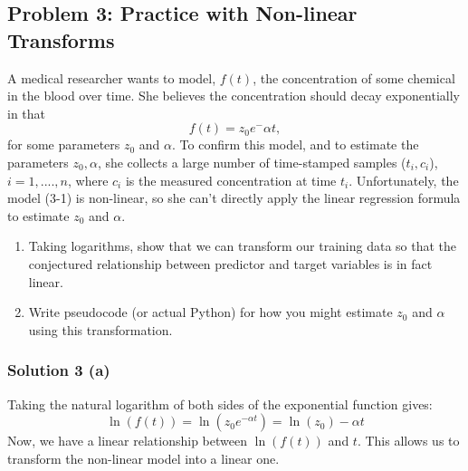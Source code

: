 \documentclass{assignment}
\begin{document}
\begin{problem}
\section{Problem 3: Practice with Non-linear Transforms}   

\noindent A medical researcher wants to model, $f(t)$, the concentration of some chemical in the blood over time. She believes the concentration should decay exponentially in that
\begin{equation}
    f(t) = z_0e^-{\alpha t},
\end{equation}
for some parameters $z_0$ and $\alpha$. To confirm this model, and to estimate the parameters $z_0, \alpha$, she collects a large number of time-stamped samples ($t_i,c_i$), $i = 1,....,n$, where $c_i$ is the measured concentration at time $t_i$. Unfortunately, the model (3-1) is non-linear, so she can't directly apply the linear regression formula to estimate $z_0$ and $\alpha$.
\begin{enumerate}[label=(\alph*)]
    \item Taking logarithms, show that we can transform our training data so that the conjectured relationship between predictor and target variables is in fact linear.
    \item Write pseudocode (or actual Python) for how you might estimate $z_0$ and $\alpha$ using this transformation. 
\end{enumerate}

\subsubsection*{Solution 3 (a)}
\noindent Taking the natural logarithm of both sides of the exponential function gives:
\begin{equation}
    \ln(f(t)) = \ln(z_0e^{-\alpha t}) = \ln(z_0) - \alpha t
\end{equation}
Now, we have a linear relationship between $\ln(f(t))$ and $t$. This allows us to transform the non-linear model into a linear one.


\end{problem}
\end{document}
